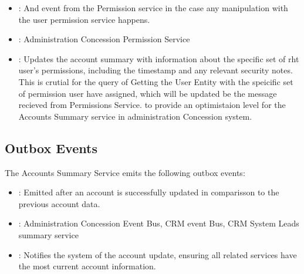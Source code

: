 \documentclass[letterpaper,10pt,english]{sphinxmanual}
\begin{document}
\sphinxAtStartPar
{}
\begin{itemize}
\item {} 
\sphinxAtStartPar
{}: And event from the Permission service in the case any manipulation with the user permission service happens.

\item {} 
\sphinxAtStartPar
{}: Administration Concession Permission Service

\item {} 
\sphinxAtStartPar
{}: Updates the account summary with information about the specific set of rht user’s permissions, including the timestamp and any relevant security notes. This is crutial for the query of Getting the User Entity with the speicific set of permission user have assigned, which will be updated be the message recieved from Permissions Service. to provide an optimistaion level for the Accounts Summary service in administration Concession system.

\end{itemize}


\subsection{Outbox Events}
\label{\detokenize{administration_concession_system/accounts_summary_service:outbox-events}}
\sphinxAtStartPar
The Accounts Summary Service emits the following outbox events:

\sphinxAtStartPar
{}
\begin{itemize}
\item {} 
\sphinxAtStartPar
{}: Emitted after an account is successfully updated in comparisson to the previous account data.

\item {} 
\sphinxAtStartPar
{}: Administration Concession Event Bus, CRM event Bus, CRM System Leads summary service

\item {} 
\sphinxAtStartPar
{}: Notifies the system of the account update, ensuring all related services have the most current account information.

\end{itemize}
\end{document}
